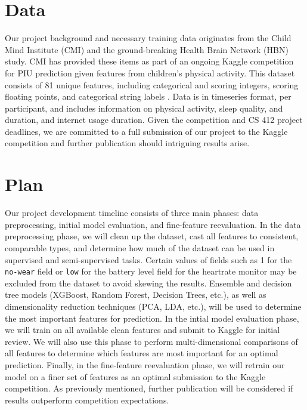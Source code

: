 \documentclass[12pt]{extarticle}
\begin{document}
\section{Data}

Our project background and necessary training data originates from the Child Mind Institute (CMI) and the ground-breaking Health Brain Network (HBN) study.
CMI has provided these items as part of an ongoing Kaggle competition for PIU prediction given features from children's physical activity. 
This dataset consists of 81 unique features, including categorical and scoring integers, scoring floating points, and categorical string labels \cite{child-mind-institute-problematic-internet-use}.
Data is in timeseries format, per participant, and includes information on physical activity, sleep quality, and duration, and internet usage duration.
Given the competition and CS 412 project deadlines, we are committed to a full submission of our project to the Kaggle competition and further publication should intriguing results arise.

\section{Plan}

Our project development timeline consists of three main phases: data preprocessing, initial model evaluation, and fine-feature reevaluation.
In the data preprocessing phase, we will clean up the dataset, cast all features to consistent, comparable types, and determine how much of the dataset can be used in supervised and semi-supervised tasks. Certain values of fields such as 1 for the \texttt{no-wear} field or \texttt{low} for the battery level field for the heartrate monitor may be excluded from the dataset to avoid skewing the results.
Ensemble and decision tree models (XGBoost, Random Forest, Decision Trees, etc.), as well as dimensionality reduction techniques (PCA, LDA, etc.), will be used to determine the most important features for prediction.
In the intial model evaluation phase, we will train on all available clean features and submit to Kaggle for initial review. 
We will also use this phase to perform multi-dimensional comparisons of all features to determine which features are most important for an optimal prediction.
Finally, in the fine-feature reevaluation phase, we will retrain our model on a finer set of features as an optimal submission to the Kaggle competition.
As previously mentioned, further publication will be considered if results outperform competition expectations.



\end{document}
